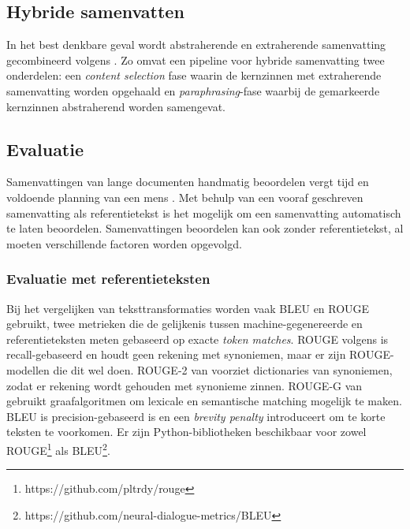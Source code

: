 \subsection{Hybride samenvatten}

In het best denkbare geval wordt abstraherende en extraherende samenvatting gecombineerd volgens \textcite{Hsu2018, Huang2019}. Zo omvat een pipeline voor hybride samenvatting twee onderdelen: een \textit{content selection} fase waarin de kernzinnen met extraherende samenvatting worden opgehaald en \textit{paraphrasing}-fase waarbij de gemarkeerde kernzinnen abstraherend worden samengevat. 

\subsection{Evaluatie}

Samenvattingen van lange documenten handmatig beoordelen vergt tijd en voldoende planning van een mens \autocite{Nenkova2004}. Met behulp van een vooraf geschreven samenvatting als referentietekst is het mogelijk om een samenvatting automatisch te laten beoordelen. Samenvattingen beoordelen kan ook zonder referentietekst, al moeten verschillende factoren worden opgevolgd.

\subsubsection{Evaluatie met referentieteksten}

Bij het vergelijken van teksttransformaties worden vaak BLEU en ROUGE gebruikt, twee metrieken die de gelijkenis tussen machine-gegenereerde en referentieteksten meten gebaseerd op exacte \textit{token matches}. ROUGE volgens \textcite{Lin2004} is recall-gebaseerd en houdt geen rekening met synoniemen, maar er zijn ROUGE-modellen die dit wel doen. ROUGE-2 van \textcite{Ganesan2018} voorziet dictionaries van synoniemen, zodat er rekening wordt gehouden met synonieme zinnen. ROUGE-G van \textcite{ShafieiBavani2018} gebruikt graafalgoritmen om lexicale en semantische matching mogelijk te maken. BLEU is precision-gebaseerd is en een \textit{brevity penalty} introduceert om te korte teksten te voorkomen. Er zijn Python-bibliotheken beschikbaar voor zowel ROUGE\footnote{https://github.com/pltrdy/rouge} als BLEU\footnote{https://github.com/neural-dialogue-metrics/BLEU}.

